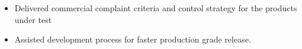 \documentclass[]{cv-class}
\begin{document}
\begin{itemize}
    \item Delivered commercial complaint criteria and control strategy for the products under test
    \item Assisted development process for faster production grade release.

\end{itemize}
\end{document}
